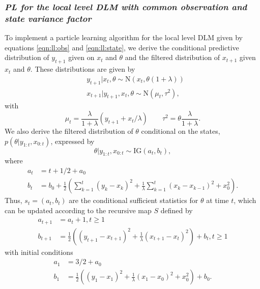 \subsubsection{\emph{PL for the local level DLM with common observation and state variance factor} \label{sec:pl:ll}}

To implement a particle learning algorithm for the local level DLM given by equations \eqref{eqn:ll:obs} and \eqref{eqn:ll:state}, we derive the conditional predictive distribution of $y_{t+1}$ given on $x_t$ and $\theta$ and the filtered distribution of $x_{t+1}$ given $x_t$ and $\theta$. These distributions are given by
\begin{align}
&y_{t+1}|x_t,\theta \sim \mbox{N}\left(x_t,\theta(1+\lambda)\right) \label{eqn:pl:ll:pred} \\
&x_{t+1}|y_{t+1},x_t,\theta \sim \mbox{N}(\mu_t,\tau^2) \label{eqn:pl:ll:state},
\end{align}
with
\begin{equation}
\mu_t = \frac{\lambda}{1+\lambda}(y_{t+1} + x_t / \lambda) \qquad \tau^2 = \theta\frac{\lambda}{1+\lambda}. \label{eqn:pl:ll:statemv}
\end{equation}
We also derive the filtered distribution of $\theta$ conditional on the states, $p(\theta|y_{1:t},x_{0:t})$, expressed by
\begin{equation}
\theta|y_{1:t},x_{0:t} \sim \mbox{IG}(a_t,b_t),
\end{equation}
where
\begin{align*}
a_t &= t + 1/2 + a_0 \\
b_t &= b_0 + \frac{1}{2}\left(\sum_{k=1}^t (y_k - x_k)^2 + \frac{1}{\lambda}\sum_{k=1}^t (x_k - x_{k-1})^2 + x_0^2\right).
\end{align*}
Thus, $s_t = (a_t,b_t)$ are the conditional sufficient statistics for $\theta$ at time $t$, which can be updated according to the recursive map $S$ defined by
\begin{align}
a_{t+1} &= a_t + 1, t \ge 1 \label{eqn:pl:ll:a} \\
b_{t+1} &= \frac{1}{2}\left((y_{t+1}-x_{t+1})^2 + \frac{1}{\lambda}(x_{t+1}-x_t)^2\right) + b_t, t \ge 1 \label{eqn:pl:ll:b}
\end{align}
with initial conditions
\begin{align*}
a_1 &= 3/2 + a_0 \\
b_1 &= \frac{1}{2}\left((y_1-x_1)^2 + \frac{1}{\lambda}(x_1-x_0)^2 + x_0^2\right) + b_0.
\end{align*}

